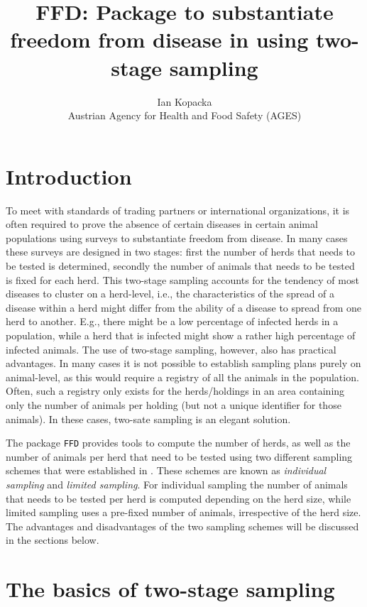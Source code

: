 \documentclass[nojss]{jss}
\title{FFD: Package to substantiate freedom from disease in \proglang{R} using two-stage sampling}
\author{Ian Kopacka\\Austrian Agency for Health and Food Safety (AGES)} \Plainauthor{Ian Kopacka}
\begin{document}

\section{Introduction} \label{sec:introduction}

To meet with standards of trading partners or international organizations, it is often required to prove the absence of certain diseases in certain animal populations using surveys to substantiate freedom from disease. In many cases these surveys are designed in two stages: first the number of herds that needs to be tested is determined, secondly the number of animals that needs to be tested is fixed for each herd. This two-stage sampling accounts for the tendency of most diseases to cluster on a herd-level, i.e., the characteristics of the spread of a disease within a herd might differ from the ability of a disease to spread from one herd to another. E.g., there might be a low percentage of infected herds in a population, while a herd that is infected might show a rather high percentage of infected animals. The use of two-stage sampling, however, also has practical advantages. In many cases it is not possible to establish sampling plans purely on animal-level, as this would require a registry of all the animals in the population. Often, such a registry only exists for the herds/holdings in an area containing only the number of animals per holding (but not a unique identifier for those animals). In these cases, two-sate sampling is an elegant solution.

The package \texttt{FFD} provides tools to compute the number of herds, as well as the number of animals per herd that need to be tested using two different sampling schemes that were established in \cite{Ziller02}. These schemes are known as \emph{individual sampling} and \emph{limited sampling}. For individual sampling the number of animals that needs to be tested per herd is computed depending on the herd size, while limited sampling uses a pre-fixed number of animals, irrespective of the herd size. The advantages and disadvantages of the two sampling schemes will be discussed in the sections below.


\section{The basics of two-stage sampling} \label{sec:2-stage-sampling}
\end{document}
